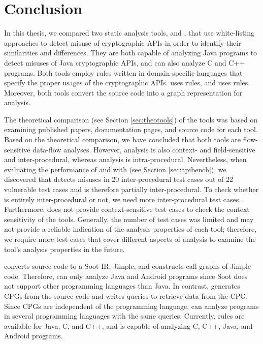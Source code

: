 \chapter{Conclusion}
\label{ch:conclusion}
In this thesis, we compared two static analysis tools, \codyze{} and \cognicryptsast, that use white-listing approaches to detect misuse of cryptographic APIs in order to identify their similarities and differences. They are both capable of analyzing Java programs to detect misuses of Java cryptographic APIs, and \codyze{} can also analyze C and C++ programs. Both tools employ rules written in domain-specific languages that specify the proper usages of the cryptographic APIs. \codyze{} uses \MARK{} rules, and \cognicryptsast{} uses \crysl{} rules. Moreover, both tools convert the source code into a graph representation for analysis. 

The theoretical comparison (see Section \ref{sec:theotools}) of the tools was based on examining published papers, documentation pages, and source code for each tool. 
Based on the theoretical comparison, we have concluded that both tools are flow-sensitive data-flow analyses. However, \cognicryptsast{} analysis is also context- and field-sensitive and inter-procedural, whereas \codyze{} analysis is intra-procedural.
Nevertheless, when evaluating the performance of \codyze{} and \cognicryptsast{} with \cryptoapibench{} (see Section \ref{sec:apibench}), we discovered that \codyze{} detects misuses in 20 inter-procedural test cases out of 22 vulnerable test cases and is therefore partially inter-procedural. To check whether \codyze{} is entirely inter-procedural or not, we need more inter-procedural test cases. Furthermore, \cryptoapibench{} does not provide context-sensitive test cases to check the context sensitivity of the tools. Generally, the number of test cases was limited and may not provide a reliable indication of the analysis properties of each tool; therefore, we require more test cases that cover different aspects of analysis to examine the tool's analysis properties in the future.

\cognicryptsast{} converts source code to a Soot IR, Jimple, and constructs call graphs of Jimple code. Therefore, \cognicryptsast{} can only analyze Java and Android programs since Soot does not support other programming languages than Java.
In contrast, \codyze{} generates CPGs from the source code and writes queries to retrieve data from the CPG. Since CPGs are independent of the programming language, \codyze{} can analyze programs in several programming languages with the same queries. Currently, \MARK{} rules are available for Java, C, and C++, and \codyze{} is capable of analyzing C, C++, Java, and Android programs.


